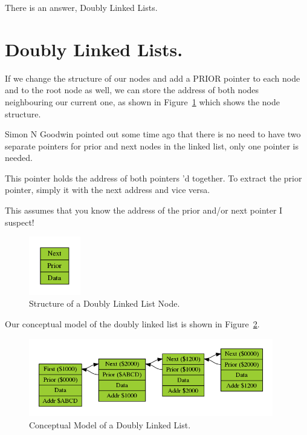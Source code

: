There is an answer, Doubly Linked Lists.

\section{Doubly Linked Lists.}
\label{ch10-double-lists}%

If we change the structure of our nodes and add a PRIOR pointer to
    each node and to the root node as well, we can store the address of both
    nodes neighbouring our current one, as shown in  Figure~\ref{fig:StructureOfADoubleLinkedListNode} which shows the node structure.
    
\begin{note}
Simon N Goodwin pointed out some time ago that there is no need to have two separate pointers for prior and next nodes in the linked list, only one pointer is needed.

This pointer holds the address of both pointers 'd together. To extract the prior pointer, simply  it with the next address and vice versa.

This assumes that you know the address of the prior and/or next pointer I suspect!
\end{note}    

\begin{figure}[h]
\center
\includegraphics[width=0.2\textwidth]{Content/images/LL_Double_node.png}
\caption{Structure of a Doubly Linked List Node.}
\label{fig:StructureOfADoubleLinkedListNode}
\end{figure}

Our conceptual model of the doubly linked list is shown in Figure~\ref{fig:ConceptualModelOfADoublyLinkedList}.

\begin{figure}[h]
\center
\includegraphics[width=0.95\textwidth]{Content/images/LL_Double_list.png}
\caption{Conceptual Model of a Doubly Linked List.}
\label{fig:ConceptualModelOfADoublyLinkedList}
\end{figure}

